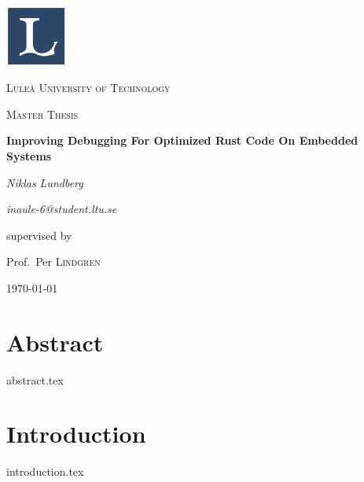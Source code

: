 \documentclass[12pt, a4paper]{book}
\begin{document}
%

\begin{titlepage}
    \centering
    \includegraphics[width=0.15\textwidth]{ltulogo.png}\par\vspace{1cm}
    {\scshape\LARGE Luleå University of Technology\par}
    \vspace{1cm}
    {\scshape\Large Master Thesis\par}
    \vspace{1.5cm}
    {\huge\bfseries Improving Debugging For Optimized Rust Code On Embedded Systems\par}
    \vspace{2cm}
    {\Large\textit{Niklas Lundberg}\par}
    {\Large\textit{inaule-6@student.ltu.se}\par}
    \vfill
    supervised by\par
    Prof.~Per \textsc{Lindgren}
    \vfill
    {\large \today\par}
\end{titlepage}


\chapter*{Abstract}
\label{sec:abstract}
{abstract.tex}

\tableofcontents 
\clearpage

\listoffigures
\clearpage

\listoftables
\clearpage

\chapter{Introduction}
\label{sec:introfuction}
{introduction.tex}
\end{document}
